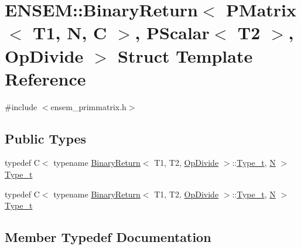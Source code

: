 \hypertarget{structENSEM_1_1BinaryReturn_3_01PMatrix_3_01T1_00_01N_00_01C_01_4_00_01PScalar_3_01T2_01_4_00_01OpDivide_01_4}{}\section{E\+N\+S\+EM\+:\+:Binary\+Return$<$ P\+Matrix$<$ T1, N, C $>$, P\+Scalar$<$ T2 $>$, Op\+Divide $>$ Struct Template Reference}
\label{structENSEM_1_1BinaryReturn_3_01PMatrix_3_01T1_00_01N_00_01C_01_4_00_01PScalar_3_01T2_01_4_00_01OpDivide_01_4}


{\ttfamily \#include $<$ensem\+\_\+primmatrix.\+h$>$}

\subsection*{Public Types}
\begin{DoxyCompactItemize}
\item 
typedef C$<$ typename \mbox{\hyperlink{structENSEM_1_1BinaryReturn}{Binary\+Return}}$<$ T1, T2, \mbox{\hyperlink{structENSEM_1_1OpDivide}{Op\+Divide}} $>$\+::\mbox{\hyperlink{structENSEM_1_1BinaryReturn_3_01PMatrix_3_01T1_00_01N_00_01C_01_4_00_01PScalar_3_01T2_01_4_00_01OpDivide_01_4_ac9773cff5366cd64bdc3213b4d2a2060}{Type\+\_\+t}}, \mbox{\hyperlink{operator__name__util_8cc_a7722c8ecbb62d99aee7ce68b1752f337}{N}} $>$ \mbox{\hyperlink{structENSEM_1_1BinaryReturn_3_01PMatrix_3_01T1_00_01N_00_01C_01_4_00_01PScalar_3_01T2_01_4_00_01OpDivide_01_4_ac9773cff5366cd64bdc3213b4d2a2060}{Type\+\_\+t}}
\item 
typedef C$<$ typename \mbox{\hyperlink{structENSEM_1_1BinaryReturn}{Binary\+Return}}$<$ T1, T2, \mbox{\hyperlink{structENSEM_1_1OpDivide}{Op\+Divide}} $>$\+::\mbox{\hyperlink{structENSEM_1_1BinaryReturn_3_01PMatrix_3_01T1_00_01N_00_01C_01_4_00_01PScalar_3_01T2_01_4_00_01OpDivide_01_4_ac9773cff5366cd64bdc3213b4d2a2060}{Type\+\_\+t}}, \mbox{\hyperlink{operator__name__util_8cc_a7722c8ecbb62d99aee7ce68b1752f337}{N}} $>$ \mbox{\hyperlink{structENSEM_1_1BinaryReturn_3_01PMatrix_3_01T1_00_01N_00_01C_01_4_00_01PScalar_3_01T2_01_4_00_01OpDivide_01_4_ac9773cff5366cd64bdc3213b4d2a2060}{Type\+\_\+t}}
\end{DoxyCompactItemize}


\subsection{Member Typedef Documentation}
\mbox{\label{structENSEM_1_1BinaryReturn_3_01PMatrix_3_01T1_00_01N_00_01C_01_4_00_01PScalar_3_01T2_01_4_00_01OpDivide_01_4_ac9773cff5366cd64bdc3213b4d2a2060}} 
